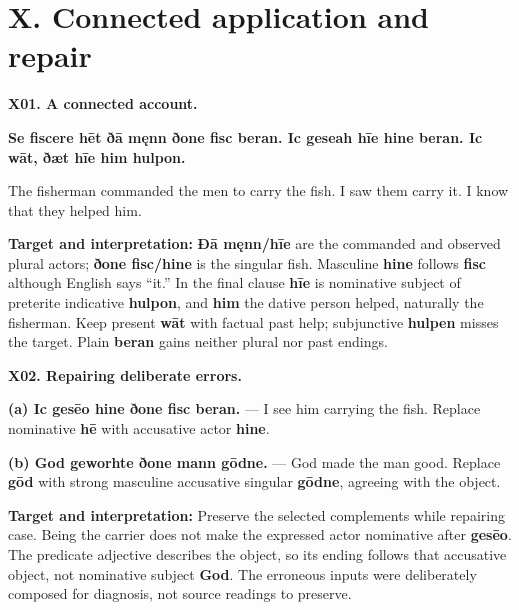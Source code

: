 \section*{X. Connected application and repair}

\par\begin{minipage}{\linewidth}\raggedright
\textbf{X01. A connected account.}

\textbf{Se fiscere hēt ðā męnn ðone fisc beran. Ic geseah hīe hine beran. Ic wāt, ðæt hīe him hulpon.}

The fisherman commanded the men to carry the fish. I saw them carry it. I know that they helped him.

\textbf{Target and interpretation:} \textbf{Ðā męnn/\allowbreak{}hīe} are the commanded and observed plural actors; \textbf{ðone fisc/\allowbreak{}hine} is the singular fish. Masculine \textbf{hine} follows \textbf{fisc} although English says “it.” In the final clause \textbf{hīe} is nominative subject of preterite indicative \textbf{hulpon}, and \textbf{him} the dative person helped, naturally the fisherman. Keep present \textbf{wāt} with factual past help; subjunctive \textbf{hulpen} misses the target. Plain \textbf{beran} gains neither plural nor past endings.

\end{minipage}\par\addvspace{4pt}

\par\begin{minipage}{\linewidth}\raggedright
\textbf{X02. Repairing deliberate errors.}

\textbf{(a) Ic gesēo hine ðone fisc beran.} — I see him carrying the fish. Replace nominative \textbf{hē} with accusative actor \textbf{hine}.

\textbf{(b) God geworhte ðone mann gōdne.} — God made the man good. Replace \textbf{gōd} with strong masculine accusative singular \textbf{gōdne}, agreeing with the object.

\textbf{Target and interpretation:} Preserve the selected complements while repairing case. Being the carrier does not make the expressed actor nominative after \textbf{gesēo}. The predicate adjective describes the object, so its ending follows that accusative object, not nominative subject \textbf{God}. The erroneous inputs were deliberately composed for diagnosis, not source readings to preserve.

\end{minipage}\par\addvspace{4pt}

